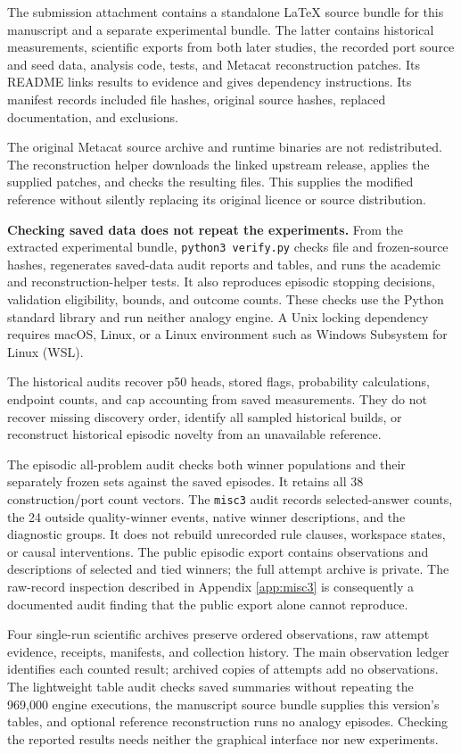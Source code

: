 \documentclass[10pt,letterpaper]{article}
\begin{document}
The submission attachment contains a standalone LaTeX source bundle for this manuscript
and a separate experimental bundle. The latter contains historical measurements,
scientific exports from both later studies, the recorded port source and seed data,
analysis code, tests, and Metacat reconstruction patches. Its README links results to
evidence and gives dependency instructions. Its manifest records included file hashes,
original source hashes, replaced documentation, and exclusions.

The original Metacat source archive and runtime binaries are not redistributed. The
reconstruction helper downloads the linked upstream release, applies the supplied patches,
and checks the resulting files. This supplies the modified reference without silently
replacing its original licence or source distribution.

\textbf{Checking saved data does not repeat the experiments.} From the extracted
experimental bundle, \texttt{python3\ verify.py} checks file and frozen-source hashes,
regenerates saved-data audit reports and tables, and runs the academic and
reconstruction-helper tests. It also reproduces episodic stopping decisions, validation
eligibility, bounds, and outcome counts. These checks use the Python standard library and
run neither analogy engine. A Unix locking dependency requires macOS, Linux, or a Linux
environment such as Windows Subsystem for Linux (WSL).

The historical audits recover p50 heads, stored flags, probability calculations, endpoint
counts, and cap accounting from saved measurements. They do not recover missing discovery
order, identify all sampled historical builds, or reconstruct historical episodic novelty
from an unavailable reference.

The episodic all-problem audit checks both winner populations and their separately frozen
sets against the saved episodes. It retains all 38 construction/port count vectors. The
\texttt{misc3} audit records selected-answer counts, the 24 outside quality-winner events,
native winner descriptions, and the diagnostic groups. It does not rebuild unrecorded rule
clauses, workspace states, or causal interventions. The public episodic export contains
observations and descriptions of selected and tied winners; the full attempt archive is
private. The raw-record inspection described in Appendix \ref{app:misc3} is consequently a
documented audit finding that the public export alone cannot reproduce.

Four single-run scientific archives preserve ordered observations, raw attempt evidence,
receipts, manifests, and collection history. The main observation ledger identifies each
counted result; archived copies of attempts add no observations. The lightweight table
audit checks saved summaries without repeating the 969,000 engine executions, the
manuscript source bundle supplies this version's tables, and optional reference
reconstruction runs no analogy episodes. Checking the reported results needs neither the
graphical interface nor new experiments.
\end{document}
